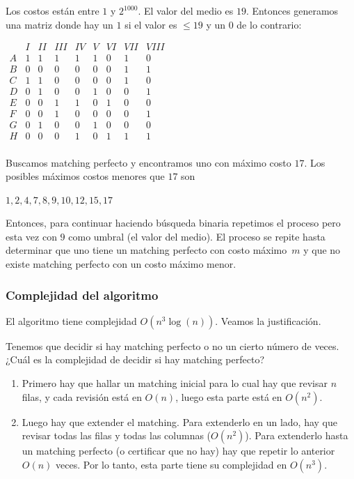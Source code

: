 \documentclass[10pt,a4paper]{article}
\begin{document}
Los costos están entre $1$ y $2^{1000}$. El valor del medio es $19$. Entonces generamos una matriz donde hay un $1$ si el valor es $\leq 19$ y un $0$ de lo contrario:

\begin{center}
$\begin{array}{c|cccccccc} & I&II&III&IV&V&VI&VII&VIII\\ \hline A&1&1&1&1&1&0&1&0\\ B&0&0&0&0&0&0&1&1\\ C&1&1&0&0&0&0&1&0\\ D&0&1&0&0&1&0&0&1\\ E&0&0&1&1&0&1&0&0\\ F&0&0&1&0&0&0&0&1\\ G&0&1&0&0&1&0&0&0\\ H&0&0&0&1&0&1&1&1\\ \end{array}$
\end{center}

Buscamos matching perfecto y encontramos uno con máximo costo $17$. Los posibles máximos costos menores que $17$ son

\begin{center}
$1,2,4,7,8,9,10,12,15,17$
\end{center}

Entonces, para continuar haciendo búsqueda binaria repetimos el proceso pero esta vez con $9$ como umbral (el valor del medio). El proceso se repite hasta determinar que uno tiene un matching perfecto con costo máximo $m$ y que no existe matching perfecto con un costo máximo menor.

\subsubsection*{Complejidad del algoritmo}

El algoritmo tiene complejidad $O(n^3 \log(n))$. Veamos la justificación.

Tenemos que decidir si hay matching perfecto o no un cierto número de veces. ¿Cuál es la complejidad de decidir si hay matching perfecto?

\begin{enumerate}

	\item Primero hay que hallar un matching inicial para lo cual hay que revisar $n$ filas, y cada revisión está en $O(n)$, luego esta parte está en $O(n^2)$.
	\item Luego hay que extender el matching. Para extenderlo en un lado, hay que revisar todas las filas y todas las columnas ($O(n^2)$). Para extenderlo hasta un matching perfecto (o certificar que no hay) hay que repetir lo anterior $O(n)$ veces. Por lo tanto, esta parte tiene su complejidad en $O(n^3)$.
\end{enumerate}
\end{document}
